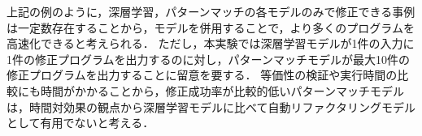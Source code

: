 \documentclass[11pt]{jreport}
\newcommand{\todo}[1]{\colorbox{yellow}{{\bf TODO}:}{\color{red} {\textbf{[#1]}}}}
\begin{document}
上記の例のように，深層学習，パターンマッチの各モデルのみで修正できる事例は一定数存在することから，モデルを併用することで，より多くのプログラムを高速化できると考えられる．
ただし，本実験では深層学習モデルが1件の入力に1件の修正プログラムを出力するのに対し，パターンマッチモデルが最大10件の修正プログラムを出力することに留意を要する．
等価性の検証や実行時間の比較にも時間がかかることから，修正成功率が比較的低いパターンマッチモデルは，時間対効果の観点から深層学習モデルに比べて自動リファクタリングモデルとして有用でないと考える．

\end{document}
